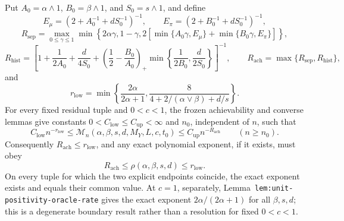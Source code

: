 Put \(A_0=\alpha\wedge1\), \(B_0=\beta\wedge1\), and \(S_0=s\wedge1\), and define
\[
E_\mu=(2+A_0^{-1}+dS_0^{-1})^{-1},\qquad E_\pi=(2+B_0^{-1}+dS_0^{-1})^{-1},
\]
\[
R_{\mathrm{sep}}=\max_{0\le\gamma\le1}\min\left\{2\alpha\gamma,1-\gamma,2\left[\min\{A_0\gamma,E_\mu\}+\min\{B_0\gamma,E_\pi\}\right]\right\},
\]
\[
R_{\mathrm{hist}}=\left[1+\frac1{2A_0}+\frac d{4S_0}+\left(\frac12-\frac{B_0}{A_0}\right)_+\min\left\{\frac1{2B_0},\frac d{2S_0}\right\}\right]^{-1},
\qquad R_{\mathrm{ach}}=\max\{R_{\mathrm{sep}},R_{\mathrm{hist}}\},
\]
and
\[
r_{\mathrm{low}}=\min\left\{\frac{2\alpha}{2\alpha+1},\frac{8}{4+2/(\alpha\vee\beta)+d/s}\right\}.
\]
For every fixed residual tuple and \(0<c<1\), the frozen achievability and converse lemmas give constants \(0<C_{\mathrm{low}}\le C_{\mathrm{up}}<\infty\) and \(n_0\), independent of \(n\), such that
\[
C_{\mathrm{low}}n^{-r_{\mathrm{low}}}
\le
\mathcal M_n(\alpha,\beta,s,d,M_Y,L,c,t_0)
\le
C_{\mathrm{up}}n^{-R_{\mathrm{ach}}}
\qquad(n\ge n_0).
\]
Consequently \(R_{\mathrm{ach}}\le r_{\mathrm{low}}\), and any exact polynomial exponent, if it exists, must obey
\[
R_{\mathrm{ach}}\le\rho(\alpha,\beta,s,d)\le r_{\mathrm{low}}.
\]
On every tuple for which the two explicit endpoints coincide, the exact exponent exists and equals their common value. At \(c=1\), separately, Lemma~\texttt{lem:unit-positivity-oracle-rate} gives the exact exponent \(2\alpha/(2\alpha+1)\) for all \(\beta,s,d\); this is a degenerate boundary result rather than a resolution for fixed \(0<c<1\).